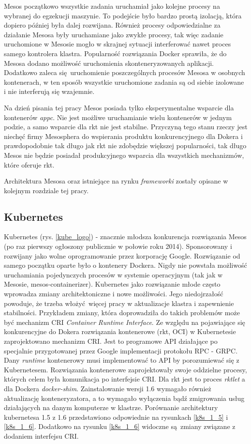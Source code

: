 \documentclass[10pt,a4paper,titlepage,twoside]{report}
\begin{document}
Mesos początkowo wszystkie zadania uruchamiał jako kolejne procesy na wybranej do egzekucji maszynie. To podejście było bardzo prostą izolacją, która dopiero później była dalej rozwijana. Również procesy odpowiedzialne za działanie Mesosa były uruchamiane jako zwykłe procesy, tak więc zadanie uruchomione w Mesosie mogło w skrajnej sytuacji interferować nawet proces samego kontrolera klastra. Popularność rozwiązania Docker sprawiła, że do Mesosa dodano możliwość uruchomienia skonteneryzowanych aplikacji. Dodatkowo zaleca się uruchomienie poszczególnych procesów Mesosa w osobnych kontenerach, w ten sposób wszystkie uruchomione zadania są od siebie izolowane i nie interferują się wzajemnie.

Na dzień pisania tej pracy Mesos posiada tylko eksperymentalne wsparcie dla kontenerów \textit{appc}. Nie jest możliwe uruchamianie wielu kontenerów w jednym podzie, a samo wsparcie dla rkt nie jest stabilne. Przyczyną tego stanu rzeczy jest niechęć firmy Mesosphera do wspierania produktu konkurencyjnego dla Dokera i prawdopodobnie tak długo jak rkt nie zdobędzie większej popularności, tak długo Mesos nie będzie posiadał produkcyjnego wsparcia dla wszystkich mechanizmów, które oferuje rkt.

Architektura Mesosa oraz istniejące na rynku \textit{frameworki} zostały opisane w kolejnym rozdziale tej pracy. 

\subsection{Kubernetes}

Kubernetes \cite{ad35}(rys. \ref{kube_logo}) - znacznie młodsza konkurencja rozwiązania Mesos (po raz pierwszy ogłoszony publicznie w połowie roku 2014). Sponsorowany i rozwijany jako wolne oprogramowanie przez korporację Google. Rozwiązanie od samego początku oparte było o kontenery Dockera. Nigdy nie powstała możliwość uruchamiania pojedynczych procesów w systemie operacyjnym (tak jak w Mesosie, mesos-containerizer). Kubernetes jako rozwiązanie młode często wprowadza zmiany architektoniczne i nowe możliwości. Jego niedojrzałość powoduje, że trzeba włożyć więcej pracy w aktualizacje klastra i zapewnienie stabilności. Przykładem zmiany, która doprowadziła do takich problemów może być mechanizm CRI \textit{Container Runtime Interface}. Ze względu na pojawiające się konkurencyjne do Dokera rozwiązania kontenerowe (rkt, OCI) w Kubernetesie zaprojektowano mechanizm CRI. Jest to programowe API działające po specjalnie przygotowanej przez Google implementacji protokołu RPC - GRPC. Dany \textit{runtime} kontenerowy musi implementować to API by porozumiewać się z Kubernetesem. Rozwiązania kontenerowe zaprojektowały swoje oddzielne procesy, których celem była komunikacja po interfejsie CRI. Dla rkt jest to proces \textit{rktlet} a dla Dockera \textit{docker-shim}. Zainstalowanie wersji 1.6 wymagało również aktualizację konteneryzatora, a to wymagało wyłączenia bądź zmigrowania usług działających na danym komputerze w klastrze. Porównanie architektury kubernetesa 1.5 z 1.6 przedstawiono odpowiednie na rysunkach \ref{k8s_1_5} i \ref{k8s_1_6}. Dodatkowo na rysunku \ref{k8s_1_6} widoczne są zmiany związane z dodaniem interfejsu CRI.
\end{document}
